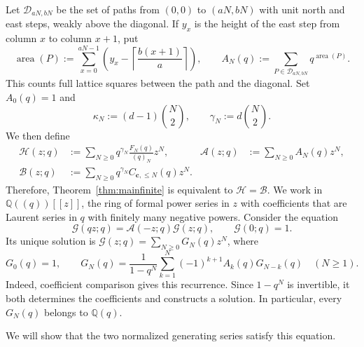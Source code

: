 \documentclass[12pt,reqno]{amsart}
\numberwithin{equation}{section}
\theoremstyle{definition}
\theoremstyle{remark}
\theoremstyle{plain}
\newcommand{\QQ}{\mathbb Q}
\newcommand{\cc}{\mathbf c}
\DeclareMathOperator{\area}{area}
\newcommand{\Hseries}{\mathscr H}
\newcommand{\Aseries}{\mathscr A}
\newcommand{\Bseries}{\mathscr B}
\begin{document}
Let $\mathcal D_{aN,bN}$ be the set of paths from $(0,0)$ to $(aN,bN)$
with unit north and east steps, weakly above the diagonal.
If $y_x$ is the height of the east step from column $x$ to column $x+1$, put
\begin{equation}\label{eq:introarea}
 \area(P):=\sum_{x=0}^{aN-1}
       \left(y_x-\left\lceil\frac{b(x+1)}a\right\rceil\right),
 \qquad A_N(q):=\sum_{P\in\mathcal D_{aN,bN}}q^{\area(P)}.
\end{equation}
This counts full lattice squares between the path and the diagonal.
Set $A_0(q)=1$ and
\begin{equation}\label{eq:shifts}
 \kappa_N:=(d-1)\binom N2,\qquad \gamma_N:=d\binom N2.
\end{equation}
We then define
\begin{equation}\label{eq:Hseries}
 \begin{aligned}
  \Hseries(z;q)&:=\sum_{N\ge0}q^{\gamma_N}\frac{F_N(q)}{(q)_N}z^N,
  &\Aseries(z;q)&:=\sum_{N\ge0}A_N(q)z^N,\\
  \Bseries(z;q)&:=\sum_{N\ge0}q^{\gamma_N}C_{\cc,\le N}(q)z^N.
 \end{aligned}
\end{equation}
Therefore, Theorem~\ref{thm:mainfinite} is equivalent to $\Hseries=\Bseries$.
We work in $\QQ((q))[[z]]$, the ring of formal power series in $z$
with coefficients that are Laurent series in $q$ with finitely many
negative powers.  Consider the equation
\begin{equation}\label{eq:commonequation}
 \mathscr G(qz;q)=\Aseries(-z;q)\mathscr G(z;q),\qquad
 \mathscr G(0;q)=1.
\end{equation}
Its unique solution is $\mathscr G(z;q)=\sum_{N\ge0}G_N(q)z^N$, where
\begin{equation}\label{eq:solutionrecurrence}
 G_0(q)=1,\qquad
 G_N(q)=\frac{1}{1-q^N}\sum_{k=1}^N(-1)^{k+1}A_k(q)G_{N-k}(q)
 \quad(N\ge1).
\end{equation}
Indeed, coefficient comparison gives this recurrence.  Since $1-q^N$
is invertible, it both determines the coefficients and constructs a
solution.  In particular, every $G_N(q)$ belongs to $\QQ(q)$.

We will show that the two normalized generating series satisfy this equation.
\end{document}
